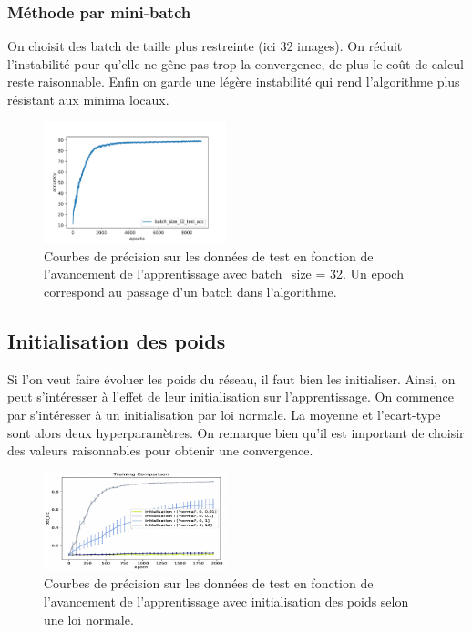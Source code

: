 \subsubsection{Méthode par mini-batch}
On choisit des batch de taille plus restreinte (ici 32 images). On réduit l'instabilité pour qu'elle ne gêne pas trop la convergence, de plus le coût de calcul reste raisonnable. Enfin on garde une légère instabilité qui rend l'algorithme plus résistant aux minima locaux.

\begin{figure}[!h]
\centering
\includegraphics[width=150pt]{"images/MLP/batch32"}
\caption{Courbes de précision sur les données de test en fonction de l'avancement de l'apprentissage avec batch\_size = 32. Un epoch correspond au passage d'un batch dans l'algorithme. }
\label{batch1}
\end{figure}


\subsection{Initialisation des poids}
Si l'on veut faire évoluer les poids du réseau, il faut bien les initialiser. Ainsi, on peut s'intéresser à l'effet de leur initialisation sur l'apprentissage.
On commence par s'intéresser à un initialisation par loi normale. La moyenne et l'ecart-type sont alors deux hyperparamètres. On remarque bien qu'il est important de choisir des valeurs raisonnables pour obtenir une convergence.
\begin{figure}[!h]
\centering
\includegraphics[width=150pt]{"images/MLP/MLP_initnormale"}
\caption{Courbes de précision sur les données de test en fonction de l'avancement de l'apprentissage avec initialisation des poids selon une loi normale.}
\label{MLP_initnormale}
\end{figure}

